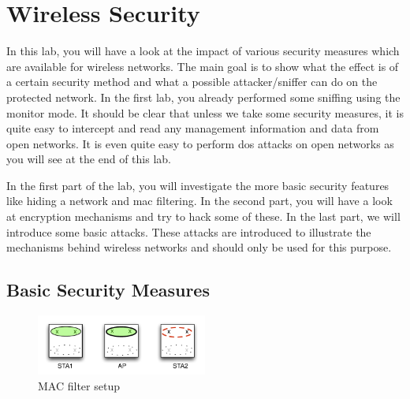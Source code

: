\setcounter{chapter}{3}
\chapter{Wireless Security}

In this lab, you will have a look at the impact of various security measures which are available for wireless networks. The main goal is to show what the effect is of a certain security method and what a possible attacker/sniffer can do on the protected network. In the first lab, you already performed some sniffing using the monitor mode. It should be clear that unless we take some security measures, it is quite easy to intercept and read any management information and data from open networks. It is even quite easy to perform \ac{dos} attacks on open networks as you will see at the end of this lab.

In the first part of the lab, you will investigate the more basic security features like hiding a network and \ac{mac} filtering. In the second part, you will have a look at encryption mechanisms and try to hack some of these. In the last part, we will introduce some basic attacks. These attacks are introduced to illustrate the mechanisms behind wireless networks and should only be used for this purpose.

\section{Basic Security Measures}


\begin{figure}[h!]
	\begin{center}
		\includegraphics[width=0.5\textwidth]{images/macfilter.pdf}
		\caption{MAC filter setup} 
		\label{fig:macfilter} 
	\end{center}
\end{figure}

